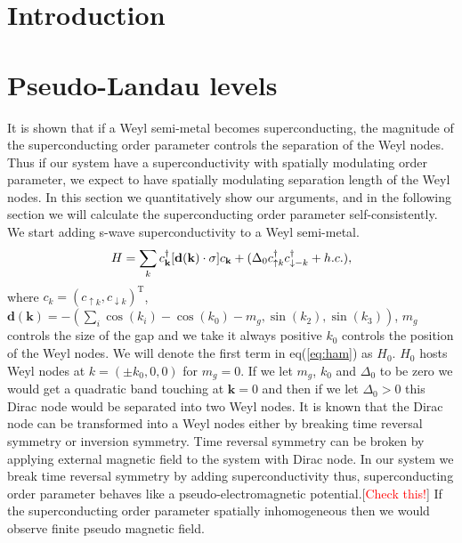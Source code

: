 \documentclass[%
 preprint,
 amsmath,amssymb,
 aps,
]{revtex4-1}
\begin{document}
\maketitle


\section{\label{sec:level1}Introduction}


\section{\label{sec:2}Pseudo-Landau levels  }
It is shown that  if a Weyl semi-metal becomes superconducting, the magnitude of the superconducting order parameter controls the separation of the Weyl nodes. Thus if our system have a superconductivity with spatially modulating order parameter, we expect to have spatially modulating separation length of the Weyl nodes.
In this section we quantitatively show our arguments, and in the following section we will calculate the superconducting order parameter self-consistently. We start adding s-wave superconductivity to a Weyl semi-metal. 
\begin{equation}
H=\sum_{\boldmath{k}}c^{\dagger}_{\mathbf{k}}[\mathbf{d(\mathbf{k})}\cdot\mathbf{\sigma}]c_{\mathbf{k}}+(\Delta_0c^{\dagger}_{\uparrow k}c^{\dagger}_{\downarrow -k}+h.c.) \label{eq:ham},
\end{equation}
where $c_k=(c_{\uparrow k},c_{\downarrow k})^{\text{T}}$, $\mathbf{d(\mathbf{k})}=-(\sum_{i}\cos(k_i)-\cos(k_0)-m_g,\sin(k_2),\sin(k_3))$, $m_g$ controls the size of the gap and we take it always positive $k_0$ controls the position of the Weyl nodes. We will denote the first term in eq(\ref{eq:ham}) as $H_0$. $H_0$ hosts Weyl nodes at $k=(\pm k_0,0,0)$ for $m_g=0$. If we let $m_g$, $k_0$ and $\Delta_0$ to be zero we would get a quadratic band touching at $\mathbf{k}=0$ and then if we let $\Delta_0>0$ this Dirac node  would be separated into two Weyl nodes. It is known that the Dirac node  can be transformed into a Weyl nodes either by breaking time reversal symmetry or inversion symmetry.  Time reversal symmetry can be broken by applying external magnetic field to the system with Dirac node. In our system we break time reversal symmetry by adding superconductivity thus, superconducting order parameter behaves like a pseudo-electromagnetic potential.[\textcolor{red}{Check this!}] If the superconducting order parameter spatially inhomogeneous then we would observe finite pseudo magnetic field. 
\end{document}
